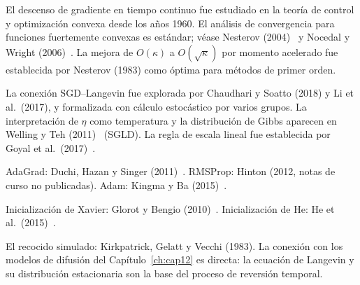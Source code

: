 \begin{notasbib}
El descenso de gradiente en tiempo continuo fue estudiado en la teoría de
control y optimización convexa desde los años 1960. El análisis de
convergencia para funciones fuertemente convexas es estándar; véase
Nesterov (2004)~\cite{nesterov2004introductory} y Nocedal y Wright
(2006)~\cite{nocedal2006numerical}. La mejora de $O(\kappa)$ a
$O(\sqrt{\kappa})$ por momento acelerado fue establecida por Nesterov
(1983) como óptima para métodos de primer orden.

La conexión SGD--Langevin fue explorada por Chaudhari y Soatto (2018) y
Li et al.\ (2017), y formalizada con cálculo estocástico por varios
grupos. La interpretación de $\eta$ como temperatura y la distribución
de Gibbs aparecen en Welling y Teh
(2011)~\cite{welling2011bayesian} (SGLD). La regla de escala lineal fue
establecida por Goyal et al.\ (2017)~\cite{goyal2017accurate}.

AdaGrad: Duchi, Hazan y Singer (2011)~\cite{duchi2011adaptive}.
RMSProp: Hinton (2012, notas de curso no publicadas).
Adam: Kingma y Ba (2015)~\cite{kingma2015adam}.

Inicialización de Xavier: Glorot y Bengio
(2010)~\cite{glorot2010understanding}.
Inicialización de He: He et al.\ (2015)~\cite{he2015delving}.

El recocido simulado: Kirkpatrick, Gelatt y Vecchi (1983). La conexión
con los modelos de difusión del Capítulo~\ref{ch:cap12} es directa: la
ecuación de Langevin y su distribución estacionaria son la base del
proceso de reversión temporal.
\end{notasbib}


